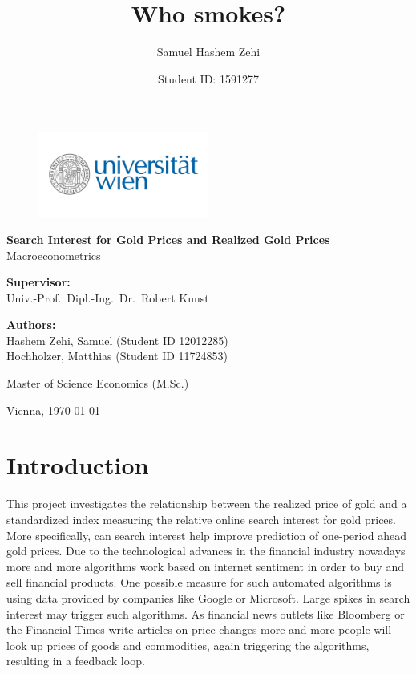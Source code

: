\documentclass[a4paper]{article}
\title{Who smokes?}
\author{Samuel Hashem Zehi}
\date{Student ID: 1591277}
\theoremstyle{definition}
\begin{document}
\begin{titlepage}
\vspace*{0.8cm}
\begin{figure}[!h]
\centering
\includegraphics[width = 0.5\textwidth]{Uni_Logo_2016.png}
\end{figure}
\begin{center}

\vspace*{1,2cm}

\huge {\bfseries Search Interest for Gold Prices and Realized Gold Prices}\\[1.8cm]

\Large {Macroeconometrics}\\[1cm]
\end{center}
\vspace{2cm}

\noindent \textbf{Supervisor:}\\
Univ.-Prof.\ Dipl.-Ing.\ Dr.\ Robert Kunst\\

\vspace{1cm}

\noindent \textbf{Authors:}\\
Hashem Zehi, Samuel (Student ID 12012285) \\
Hochholzer, Matthias (Student ID 11724853) \\

\vspace{1cm}

\noindent Master of Science Economics (M.Sc.)\\

\vspace{1cm}

\noindent Vienna, \today

\setcounter{page}{0}\clearpage
\end{titlepage}
\newpage
\tableofcontents
\newpage
\section{Introduction}
This project investigates the relationship between the realized price of gold and a standardized index measuring the relative online search interest for gold prices. More specifically, can search interest help improve prediction of one-period ahead gold prices. Due to the technological advances in the financial industry nowadays more and more algorithms work based on internet sentiment in order to buy and sell financial products. One possible measure for such automated algorithms is using data provided by companies like Google or Microsoft. Large spikes in search interest may trigger such algorithms. As financial news outlets like Bloomberg or the Financial Times write articles on price changes more and more people will look up prices of goods and commodities, again triggering the algorithms, resulting in a feedback loop. 
\end{document}
